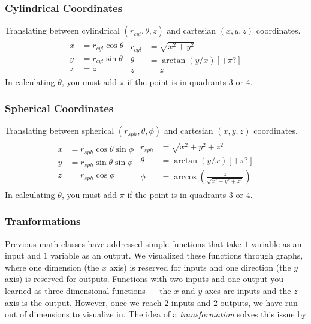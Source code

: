 \documentclass[11pt]{article}
\newenvironment{mybox}
{\begin{tcolorbox}[colback=red!5!white,colframe=red!75!black]}
{\end{tcolorbox}}
\begin{document}
\subsubsection{Cylindrical Coordinates}
\begin{mybox}
    Translating between cylindrical $(r_{cyl},\theta,z)$ and cartesian $(x,y,z)$ coordinates.
    \begin{align*}
        \begin{split}
            x &= r_{cyl}\cos{\theta}\\
            y &= r_{cyl}\sin{\theta}\\
            z &= z
        \end{split}
        \begin{split}
            r_{cyl} &= \sqrt{x^2+y^2} \\
        \theta &= \arctan{\left(y/x\right)} [+\pi?]\\
        z &= z
        \end{split}
    \end{align*}
    In calculating $\theta$, you must add $\pi$ if the point is in quadrants $3$ or $4$.
\end{mybox}
\subsubsection{Spherical Coordinates}
\begin{mybox}
Translating between spherical $(r_{sph},\theta,\phi)$ and cartesian $(x,y,z)$ coordinates.
    \begin{align*}
        \begin{split}
            x &= r_{sph}\cos{\theta}\sin{\phi}\\
            y &= r_{sph}\sin{\theta}\sin{\phi}\\
            z &= r_{sph}\cos{\phi}
        \end{split}
        \begin{split}
            r_{sph} &= \sqrt{x^2+y^2+z^2}\\
            \theta  &= \arctan{\left(y/x\right)} [+\pi?]\\
            \phi    &= \arccos{\left(\frac{z}{\sqrt{x^2+y^2+z^2}}\right)}
        \end{split}
    \end{align*}
    In calculating $\theta$, you must add $\pi$ if the point is in quadrants $3$ or $4$.
\end{mybox}

\subsubsection{Tranformations}
Previous math classes have addressed simple functions that take $1$ variable as an input and $1$ variable as an output. We visualized these functions through graphs, where one dimension (the $x$ axis) is reserved for inputs and one direction (the $y$ axis) is reserved for outputs. Functions with two inputs and one output you learned as three dimensional functions --- the $x$ and $y$ axes are inputs and the $z$ axis is the output. However, once we reach $2$ inputs and $2$ outputs, we have run out of dimensions to visualize in. The idea of a \textit{transformation} solves this issue by  
\end{document}
